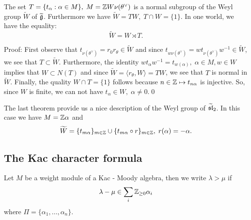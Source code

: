 \begin{itemize}
\begin{dang}
    \begin{theorem}
        The set $T=\{t_\alpha:\alpha\in M\},\; M=\mathbb{Z} W\nu(\theta^\vee)$ is a normal subgroup of 
        the Weyl group $\widetilde{W}$ of $\widetilde{\mathfrak{g}}$. Furthermore we have 
        $\widetilde{W}=TW,\; T\cap W = \{1\}$. In one world, we have the equality:
        \begin{equation}
            \widetilde{W} = W\rtimes T.
        \end{equation} 
    \end{theorem}
\end{dang}
Proof: First observe that $t_{\nu(\theta^\vee)}=r_0r_\theta \in\widetilde{W}$ and since 
$t_{w\nu(\theta^\vee)}=wt_{\nu(\theta^\vee)}w^{-1}\in\widetilde{W}$, we see that $T\subset \widetilde{W}$. Furthermore, 
the identity $wt_\alpha w^{-1}=t_{w(\alpha)},\;\alpha\in M,w\in W$ implies that $W\subset N(T)$ and since 
$\widetilde{W}=\langle r_\theta, W\rangle=TW$, we see that $T$ is normal in $\widetilde{W}$. Finally, the quality 
$W\cap T=\{1\}$ follows because $n\in\mathbb{Z}\mapsto t_{n\alpha}$ is injective. So, since $W$ is finite, we can not have 
$t_\alpha\in W,\;\alpha\neq0$.\qed


\begin{example}
    The last theorem provide us a nice description of the Weyl group of $\widetilde{\mathfrak{sl}}_2$. In this case we 
    have $M=\mathbb{Z}\alpha$ and 
    \begin{equation}
        \widetilde{W} = \{t_{m\alpha}\}_{m\in\mathbb{Z}}\cup\{t_{m\alpha}\circ r\}_{m\in\mathbb{Z}},\;r(\alpha)=-\alpha.
    \end{equation}
\end{example}
\end{itemize}

\subsection{The Kac character formula}
\begin{remark}
    Let $M$ be a weight module of a Kac - Moody algebra, then we write $\lambda>\mu$ if 
    \begin{equation}
        \lambda - \mu \in \sum_i\mathbb{Z}_{\geq0}\alpha_i 
    \end{equation}
    where $\Pi=\{\alpha_1,\dots,\alpha_n\}$.
\end{remark}

